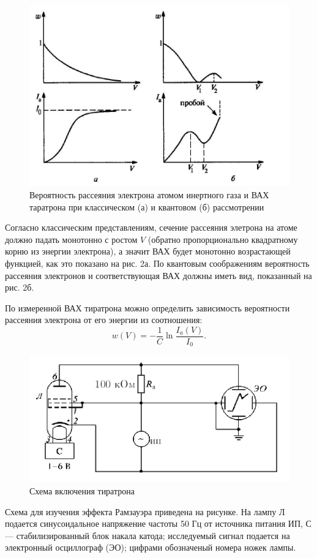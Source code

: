 \documentclass[a4paper,12pt]{article}
\theoremstyle{plain} %
\theoremstyle{definition} %
\theoremstyle{remark} %
\begin{document}
\begin{figure}
    \vspace{-100pt}
    \begin{center}
        \includegraphics[width=0.9 \textwidth]{pic2.png}
    \end{center}
    \caption{Вероятность рассеяния электрона атомом инертного газа и ВАХ таратрона при классическом (а) и квантовом (б) рассмотрении}
\end{figure}
Согласно классическим представлениям, сечение рассеяния элетрона на атоме должно падать монотонно с ростом $V$ (обратно пропорционально квадратному корню из энергии
электрона), а значит ВАХ будет монотонно возрастающей функцией, как это показано на рис. 2а. По квантовым соображениям вероятность рассеяния электронов и соответствующая ВАХ должны иметь вид, показанный на рис. 2б.

По измеренной ВАХ тиратрона можно определить зависимость вероятности рассеяния электрона от его энергии из соотношения:
\[w(V) = -\frac{1}{C}\ln{\frac{I_a(V)}{I_0}}.\]

\begin{figure}
    \begin{center}
        \includegraphics[width=0.89 \textwidth]{pic3.png}
    \end{center}
    \caption{Схема включения тиратрона}
\end{figure}
Схема для изучения эффекта Рамзауэра приведена на рисунке. На лампу Л подается синусоидальное напряжение частоты 50 Гц от источника питания ИП, С --- стабилизированный блок накала катода; исследуемый сигнал подается на электронный осциллограф (ЭО); цифрами обозначеный номера ножек лампы.
\end{document}
